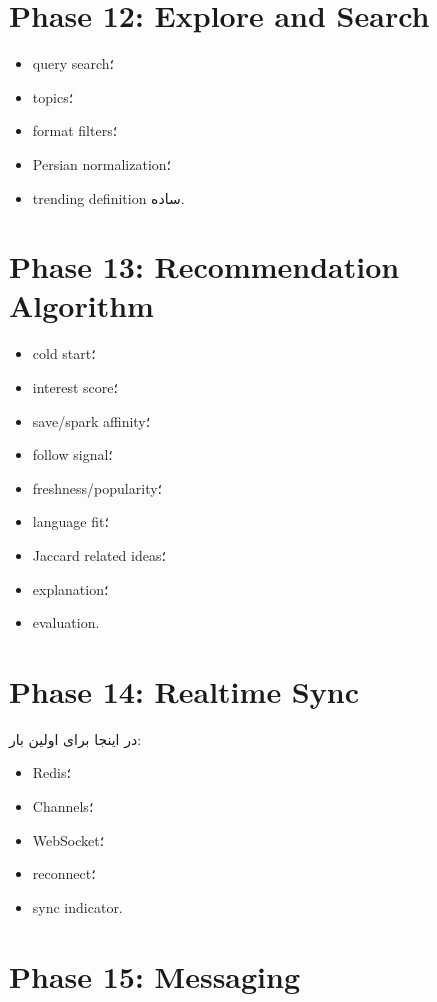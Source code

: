 \section{Phase 12: Explore and Search}

\begin{itemize}
  \item query search؛
  \item topics؛
  \item format filters؛
  \item Persian normalization؛
  \item trending definition ساده.
\end{itemize}

\section{Phase 13: Recommendation Algorithm}

\begin{itemize}
  \item cold start؛
  \item interest score؛
  \item save/spark affinity؛
  \item follow signal؛
  \item freshness/popularity؛
  \item language fit؛
  \item Jaccard related ideas؛
  \item explanation؛
  \item evaluation.
\end{itemize}

\section{Phase 14: Realtime Sync}

در اینجا برای اولین بار:
\begin{itemize}
  \item Redis؛
  \item Channels؛
  \item WebSocket؛
  \item reconnect؛
  \item sync indicator.
\end{itemize}

\section{Phase 15: Messaging}

